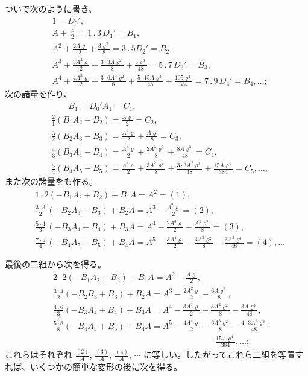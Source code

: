 \documentclass[11pt]{article}
\newcommand{\scanpage}[2]{\clearpage\setcounter{footnote}{0}\noindent{\footnotesize\color{gray}PDF #1 頁 · #2}\par\medskip}
\begin{document}
\scanpage{0273}{印刷頁 259}
ついで次のように書き、
\[
\begin{aligned}
&1 = D_0',\\
&A + \frac{\varrho}{2} = 1\,.\,3\,D_1' = B_1,\\
&A^2 + \frac{2A\varrho}{2} + \frac{3\varrho^2}{8} = 3\,.\,5D_2' = B_2,\\
&A^3 + \frac{3A^2\varrho}{2} + \frac{3\cdot 3A\varrho^2}{8} + \frac{5\varrho^3}{48} = 5\,.\,7\,D_3' = B_3,\\
&A^4 + \frac{4A^3\varrho}{2} + \frac{3\cdot 6A^2\varrho^2}{8} + \frac{5\cdot 15A\varrho^3}{48} + \frac{105\varrho^4}{384} = 7\,.\,9\,D_4' = B_4, \ldots;
\end{aligned}
\]
次の諸量を作り、
\[
\begin{aligned}
&\qquad B_1 = D_0' A_1 = C_1,\\
&\frac{2}{1}(B_1 A_2 - B_2) = \frac{A\varrho}{2} = C_2,\\
&\frac{3}{2}(B_2 A_3 - B_3) = \frac{A^2\varrho}{2} + \frac{A\varrho}{8} = C_3,\\
&\frac{4}{3}(B_3 A_4 - B_4) = \frac{A^3\varrho}{2} + \frac{2A^2\varrho^2}{8} + \frac{8A\varrho^3}{48} = C_4,\\
&\frac{5}{4}(B_4 A_5 - B_5) = \frac{A^4\varrho}{2} + \frac{3A^3\varrho^2}{8} + \frac{3\cdot 3A^2\varrho^3}{48} + \frac{15A\varrho^4}{384} = C_5, \ldots,
\end{aligned}
\]
また次の諸量をも作る。
\[
\begin{aligned}
&1\cdot 2(- B_1 A_2 + B_2) + B_1 A = A^2 = (1),\\
&\frac{3\cdot 3}{2}\,(- B_2 A_3 + B_3) + B_2 A = A^3 - \frac{A^2\varrho}{2} = (2),\\
&\frac{5\cdot 4}{3}\,(- B_3 A_4 + B_4) + B_3 A = A^4 - \frac{2A^3\varrho}{2} - \frac{A^2\varrho^2}{8} = (3),\\
&\frac{7\cdot 5}{4}\,(- B_4 A_5 + B_5) + B_4 A = A^5 - \frac{3A^4\varrho}{2} - \frac{3A^3\varrho^2}{8} - \frac{3A^2\varrho^3}{48} = (4), \ldots
\end{aligned}
\]

最後の二組から次を得る。
\[
\begin{aligned}
&2\cdot 2(- B_1 A_2 + B_2) + B_1 A = A^2 - \frac{A\varrho}{2},\\
&\frac{3\cdot 4}{2}(- B_2 B_3 + B_3) + B_2 A = A^3 - \frac{2A^2\varrho}{2} - \frac{6A\varrho^2}{8},\\
&\frac{4\,.\,6}{3}(- B_3 A_4 + B_4) + B_3 A = A^4 - \frac{3A^3\varrho}{2} - \frac{3A^2\varrho^2}{8} - \frac{3A\varrho^3}{48},\\
&\frac{5\cdot 8}{8}(- B_4 A_5 + B_5) + B_4 A = A^5 - \frac{4A^4\varrho}{2} - \frac{6A^3\varrho^2}{8} - \frac{4\cdot 3A^2\varrho^3}{48}\\
&\hspace{18em} - \frac{15A\varrho^4}{384}, \ldots;
\end{aligned}
\]
これらはそれぞれ $\frac{(2)}{A}$, $\frac{(3)}{A}$, $\frac{(4)}{A}$, $\cdots$ に等しい。したがってこれら二組を等置すれば、いくつかの簡単な変形の後に次を得る。
\end{document}
